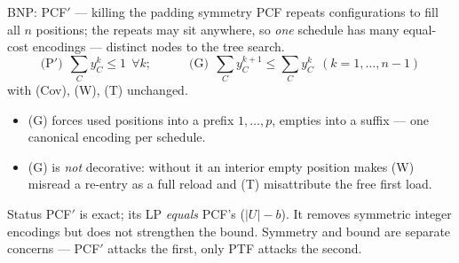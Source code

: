 \documentclass[10pt]{beamer}
\newcommand{\U}{U}\newcommand{\Kst}{K^{\ast}}\newcommand{\Zst}{Z^{\ast}}
\newcommand{\cov}{\lvert\U\rvert-b}
\newcommand{\good}[1]{\textcolor{tight}{#1}}
\newcommand{\bad}[1]{\textcolor{acc}{#1}}
\begin{document}
\begin{frame}{BNP: PCF$'$ --- killing the padding symmetry}
PCF repeats configurations to fill all $n$ positions; the repeats may sit anywhere, so
\emph{one} schedule has \bad{many equal-cost encodings} --- distinct nodes to the tree search.
\[
  \text{(P$'$)}\ \ \sum_{C} y_C^{k}\le1\ \ \forall k;
  \qquad\quad
  \text{(G)}\ \ \sum_{C} y_C^{k+1}\le\sum_{C} y_C^{k}\ \ (k=1,\dots,n-1)
\]
with (Cov), (W), (T) unchanged.
\begin{itemize}
  \item (G) forces used positions into a \good{prefix} $1,\dots,p$, empties into a suffix
        --- one canonical encoding per schedule.
  \item (G) is \emph{not} decorative: without it an interior empty position makes (W)
        misread a re-entry as a full reload and (T) misattribute the free first load.
\end{itemize}
\begin{block}{Status}
PCF$'$ is exact; its LP \emph{equals} PCF's ($\cov$). It removes symmetric integer
encodings \good{but does not strengthen the bound}. Symmetry and bound are separate
concerns --- PCF$'$ attacks the first, only PTF attacks the second.
\end{block}
\end{frame}
\end{document}
